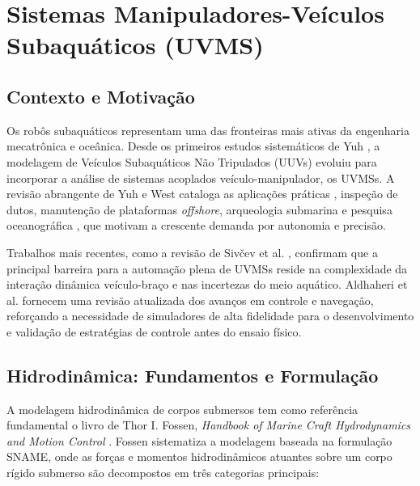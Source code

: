 \section{Sistemas Manipuladores-Veículos Subaquáticos (UVMS)}

\subsection{Contexto e Motivação}

Os robôs subaquáticos representam uma das fronteiras mais ativas da engenharia mecatrônica e oceânica. Desde os primeiros estudos sistemáticos de Yuh \cite{yuh1990modeling}, a modelagem de Veículos Subaquáticos Não Tripulados (UUVs) evoluiu para incorporar a análise de sistemas acoplados veículo-manipulador, os UVMSs. A revisão abrangente de Yuh e West \cite{yuh2001underwater} cataloga as aplicações práticas , inspeção de dutos, manutenção de plataformas \textit{offshore}, arqueologia submarina e pesquisa oceanográfica , que motivam a crescente demanda por autonomia e precisão.

Trabalhos mais recentes, como a revisão de Sivčev et al. \cite{sivcev2018underwater}, confirmam que a principal barreira para a automação plena de UVMSs reside na complexidade da interação dinâmica veículo-braço e nas incertezas do meio aquático. Aldhaheri et al. \cite{aldhaheri2022underwater} fornecem uma revisão atualizada dos avanços em controle e navegação, reforçando a necessidade de simuladores de alta fidelidade para o desenvolvimento e validação de estratégias de controle antes do ensaio físico.

\subsection{Hidrodinâmica: Fundamentos e Formulação}

A modelagem hidrodinâmica de corpos submersos tem como referência fundamental o livro de Thor I. Fossen, \textit{Handbook of Marine Craft Hydrodynamics and Motion Control} \cite{fossen2011handbook}. Fossen sistematiza a modelagem baseada na formulação SNAME, onde as forças e momentos hidrodinâmicos atuantes sobre um corpo rígido submerso são decompostos em três categorias principais:

